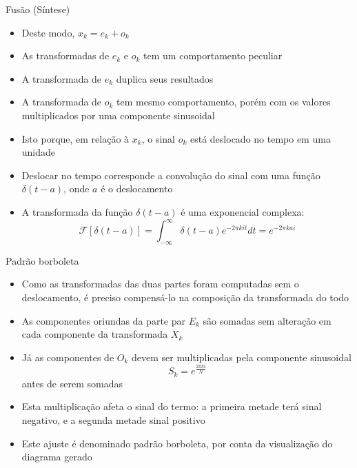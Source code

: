 \begin{frame}[fragile]{Fusão (Síntese)}

    \begin{itemize}
        \item Deste modo, $x_k = e_k + o_k$

        \item As transformadas de $e_k$ e $o_k$ tem um comportamento peculiar

        \item A transformada de $e_k$ duplica seus resultados

        \item A transformada de $o_k$ tem mesmo comportamento, porém com os valores multiplicados
            por uma componente sinusoidal

        \item Isto porque, em relação à $x_k$, o sinal $o_k$ está deslocado no tempo em uma
            unidade

        \item Deslocar no tempo corresponde a convolução do sinal com uma função $\delta(t - a)$,
            onde $a$ é o deslocamento

        \item A transformada da função $\delta(t - a)$ é uma exponencial complexa:
        \[
            \mathcal{F}[\delta(t - a)] = \int_{-\infty}^{\infty} \delta(t - a)e^{-2\pi kit}dt =
                e^{-2\pi kai}
        \]
    
    \end{itemize}

\end{frame}



\begin{frame}[fragile]{Padrão borboleta}

    \begin{itemize}
        \item Como as transformadas das duas partes foram computadas sem o deslocamento, é preciso
            compensá-lo na composição da transformada do todo

        \item As componentes oriundas da parte par $E_k$ são somadas sem alteração em cada
            componente da transformada $X_k$

        \item Já as componentes de $O_k$ devem ser multiplicadas pela componente sinusoidal
        \[
            S_k = e^{\frac{2\pi ki}{N}}
        \]
        antes de serem somadas

        \item Esta multiplicação afeta o sinal do termo: a primeira metade terá sinal negativo, e
            a segunda metade sinal positivo

        \item Este ajuste é denominado padrão borboleta, por conta da visualização do diagrama
            gerado
    \end{itemize}

\end{frame}



